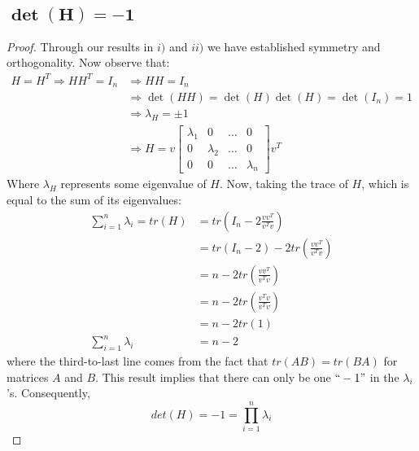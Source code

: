 \documentclass[12pt]{article}
\newcommand{\RA}{\Rightarrow}
\begin{document}
	\subsection{$ \mathbf{ \det(H)=-1 } $}
	\begin{proof}
		Through our results in $ i) $ and $ ii) $ we have established symmetry and orthogonality. Now observe that: 
		\begin{align*}
			H=H^T \RA HH^T=I_n &\RA HH=I_n\\
			&\RA \det(HH) = \det(H)\det(H)=\det(I_n)=1\\
			&\RA \lambda_H = \pm 1\\
			&\RA H=v \begin{bmatrix}
			\lambda_1 & 0 & \dots & 0\\
			0 & \lambda_2 & \dots & 0 \\
			0 & 0 & \dots & \lambda_n
			\end{bmatrix} v^T
		\end{align*}
		Where $ \lambda_H $ represents some eigenvalue of $ H $. Now, taking the trace of $ H $, which is equal to the sum of its eigenvalues:
		\begin{align*}
			\sum_{i=1}^{n} \lambda_i = tr(H) &= tr(I_{n}-2 \frac{v v^{T}}{v^T v}) \\
			&=  tr(I_{n}-2) -  2tr(  \frac{v v^{T}}{v^T v} ) \\
			&= n -2 tr(\frac{v v^{T}}{v^T v}) \\
			&= n - 2 tr(\frac{v^T v}{v^T v}) \\
			&= n-2tr(1)\\
			\sum_{i=1}^{n} \lambda_i&=n-2
		\end{align*}
		where the third-to-last line comes from the fact that $ tr(AB)=tr(BA) $ for matrices $ A $ and $ B $. This result implies that there can only be one $``-1" $ in the $ \lambda_i $'s. Consequently, \[ det(H) = -1 = \prod_{i=1}^{n} \lambda_i \]
	\end{proof}
\end{document}
